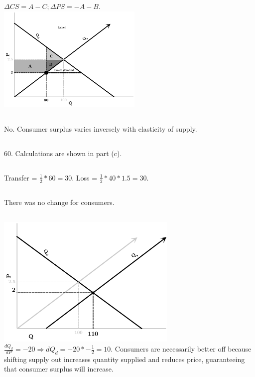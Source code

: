 \documentclass{article}
\begin{document}
	\subsection[d]{}
		$\Delta CS = A-C; \Delta PS = -A - B.$\\
		\includegraphics[height=2in]{Charts/7d}
	\subsection[e]{}
		No. Consumer surplus varies inversely with elasticity of supply. 
	\subsection[f]{}
		60. Calculations are shown in part (c). 
	\subsection[g]{}
		Transfer = $\frac{1}{2}*60 = 30 $. Loss = $\frac{1}{2}*40*1.5 = 30$.
	\subsection[h]{}
		There was no change for consumers. 
	\subsection[i]{}
		\includegraphics[height=2.5in]{Charts/7i}\\
		$\frac{dQ_d}{dP} = -20 \Rightarrow dQ_d  = -20*-\frac{1}{2} = 10.$ Consumers are necessarily better off because shifting supply out increases quantity supplied and reduces price, guaranteeing that consumer surplus will increase. \\
\end{document}

